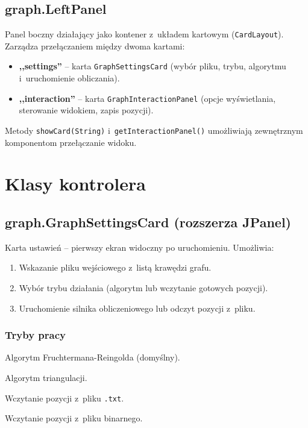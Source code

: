 \documentclass[12pt]{article}
\begin{document}

\subsection{graph.LeftPanel}

Panel boczny działający jako kontener z~układem kartowym
(\texttt{CardLayout}). Zarządza przełączaniem między dwoma kartami:
\begin{itemize}
    \item \textbf{,,settings''} -- karta \texttt{GraphSettingsCard} (wybór
          pliku, trybu, algorytmu i~uruchomienie obliczania).
    \item \textbf{,,interaction''} -- karta \texttt{GraphInteractionPanel}
          (opcje wyświetlania, sterowanie widokiem, zapis pozycji).
\end{itemize}

Metody \texttt{showCard(String)} i~\texttt{getInteractionPanel()} umożliwiają
zewnętrznym komponentom przełączanie widoku.

\section{Klasy kontrolera}

\subsection{graph.GraphSettingsCard (rozszerza JPanel)}

Karta ustawień -- pierwszy ekran widoczny po uruchomieniu. Umożliwia:
\begin{enumerate}
    \item Wskazanie pliku wejściowego z~listą krawędzi grafu.
    \item Wybór trybu działania (algorytm lub wczytanie gotowych pozycji).
    \item Uruchomienie silnika obliczeniowego lub odczyt pozycji z~pliku.
\end{enumerate}

\subsubsection{Tryby pracy}

\begin{description}[leftmargin=5cm, style=nextline]
    \item[\texttt{radioFrucht}] Algorytm Fruchtermana-Reingolda (domyślny).
    \item[\texttt{radioTriang}] Algorytm triangulacji.
    \item[\texttt{radioLoadTxt}] Wczytanie pozycji z~pliku \texttt{.txt}.
    \item[\texttt{radioLoadBin}] Wczytanie pozycji z~pliku binarnego.
\end{description}
\end{document}
